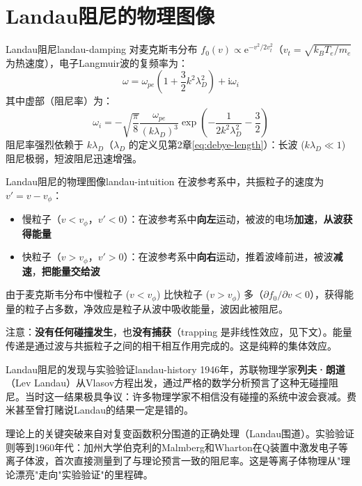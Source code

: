 \documentclass[12pt,a4paper,openany,oneside]{book}
\newcommand{\ii}{\mathrm{i}}
\newcommand{\ee}{\mathrm{e}}
\newcommand{\difficulty}[1]{\marginnote{\hfill\textcolor{coverMid!80}{\rule[-0.1em]{2pt}{0.9em}}\,\textcolor{coverMid}{\footnotesize\textbf{[#1]}}}}
\begin{document}
\section{Landau阻尼的物理图像}\difficulty{基础}

\begin{theorem}{Landau阻尼}{landau-damping}
对麦克斯韦分布 $f_0(v) \propto \ee^{-v^2/2v_t^2}$（$v_t=\sqrt{k_BT_e/m_e}$ 为热速度），电子Langmuir波的复频率为：
\[
\omega = \omega_{pe}\left(1 + \frac{3}{2}k^2\lambda_D^2\right) + \ii\omega_i
\]
其中虚部（阻尼率）为：
\[
\omega_i = -\sqrt{\frac{\pi}{8}}\frac{\omega_{pe}}{(k\lambda_D)^3}\exp\left(-\frac{1}{2k^2\lambda_D^2} - \frac{3}{2}\right)
\]
阻尼率强烈依赖于 $k\lambda_D$（$\lambda_D$ 的定义见第2章\cref{eq:debye-length}）：长波 ($k\lambda_D \ll 1$) 阻尼极弱，短波阻尼迅速增强。
\end{theorem}

\begin{insight}{Landau阻尼的物理图像}{landau-intuition}
在波参考系中，共振粒子的速度为 $v' = v - v_\phi$：
\begin{itemize}
\item 慢粒子（$v < v_\phi$，$v' < 0$）：在波参考系中\textbf{向左}运动，被波的电场\textbf{加速}，\textbf{从波获得能量}
\item 快粒子（$v > v_\phi$，$v' > 0$）：在波参考系中\textbf{向右}运动，推着波峰前进，被波\textbf{减速}，\textbf{把能量交给波}
\end{itemize}

由于麦克斯韦分布中慢粒子 ($v < v_\phi$) 比快粒子 ($v > v_\phi$) 多（$\partial f_0/\partial v < 0$），获得能量的粒子占多数，净效应是粒子从波中吸收能量，波因此被阻尼。

注意：\textbf{没有任何碰撞发生}，也\textbf{没有捕获}（trapping 是非线性效应，见下文）。能量传递是通过波与共振粒子之间的相干相互作用完成的。这是纯粹的集体效应。
\end{insight}

\begin{history}{Landau阻尼的发现与实验验证}{landau-history}
1946年，苏联物理学家\textbf{列夫·朗道}（Lev Landau）从Vlasov方程出发，通过严格的数学分析预言了这种无碰撞阻尼。当时这一结果极具争议：许多物理学家不相信没有碰撞的系统中波会衰减。费米甚至曾打赌说Landau的结果一定是错的。

理论上的关键突破来自对复变函数积分围道的正确处理（Landau围道）。实验验证则等到1960年代：加州大学伯克利的Malmberg和Wharton在Q装置中激发电子等离子体波，首次直接测量到了与理论预言一致的阻尼率。这是等离子体物理从"理论漂亮"走向"实验验证"的里程碑。
\end{history}
\end{document}
